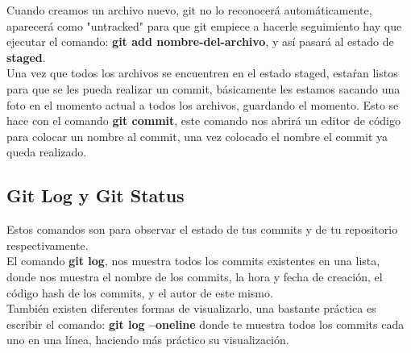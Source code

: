 Cuando creamos un archivo nuevo, git no lo reconocerá automáticamente, aparecerá como "untracked" para que git empiece a hacerle seguimiento hay que ejecutar el comando: \textbf{git add nombre-del-archivo}, y así pasará al estado de \textbf{staged}.\\

Una vez que todos los archivos se encuentren en el estado staged, estaŕan listos para que se les pueda realizar un commit, básicamente les estamos sacando una foto en el momento actual a todos los archivos, guardando el momento. Esto se hace con el comando \textbf{git commit}, este comando nos abrirá un editor de código para colocar un nombre al commit, una vez colocado el nombre el commit ya queda realizado.

\subsection{Git Log y Git Status}
Estos comandos son para observar el estado de tus commits y de tu repositorio respectivamente.\\

El comando \textbf{git log}, nos muestra todos los commits existentes en una lista, donde nos muestra el nombre de los commits, la hora y fecha de creación, el código hash de los commits, y el autor de este mismo.\\
También existen diferentes formas de visualizarlo, una bastante práctica es escribir el comando: \textbf{git log --oneline} donde te muestra todos los commits cada uno en una línea, haciendo más práctico su visualización.

